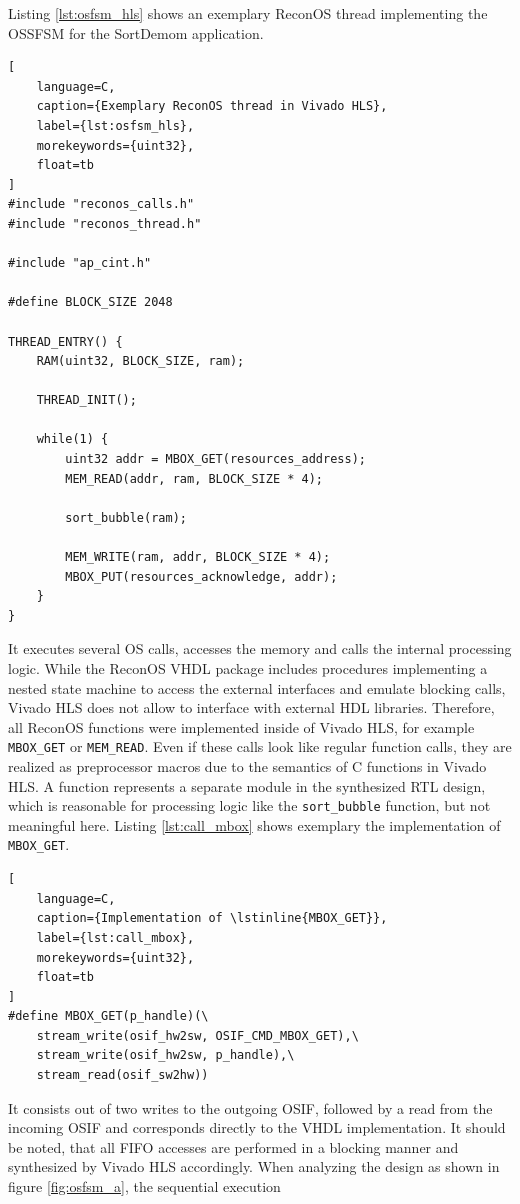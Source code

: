 Listing \ref{lst:osfsm_hls} shows an exemplary ReconOS thread implementing the
\ac{OSSFSM} for the SortDemom application.
\begin{lstlisting}[
	language=C,
	caption={Exemplary ReconOS thread in Vivado HLS},
	label={lst:osfsm_hls},
	morekeywords={uint32},
	float=tb
]
#include "reconos_calls.h"
#include "reconos_thread.h"

#include "ap_cint.h"

#define BLOCK_SIZE 2048

THREAD_ENTRY() {
	RAM(uint32, BLOCK_SIZE, ram);

	THREAD_INIT();

	while(1) {
		uint32 addr = MBOX_GET(resources_address);
		MEM_READ(addr, ram, BLOCK_SIZE * 4);

		sort_bubble(ram);

		MEM_WRITE(ram, addr, BLOCK_SIZE * 4);
		MBOX_PUT(resources_acknowledge, addr);
	}
}
\end{lstlisting}
It executes several \ac{OS} calls, accesses the memory and calls the internal
processing logic. While the ReconOS \ac{VHDL} package includes procedures
implementing a nested state machine to access the external interfaces and
emulate blocking calls, Vivado HLS does not allow to interface with external
\ac{HDL} libraries. Therefore, all ReconOS functions were implemented inside
of Vivado HLS, for example \lstinline{MBOX_GET} or \lstinline{MEM_READ}. Even
if these calls look like regular function calls, they are realized as
preprocessor macros due to the semantics of C functions in Vivado HLS. A
function represents a separate module in the synthesized \ac{RTL} design,
which is reasonable for processing logic like the \lstinline{sort_bubble}
function, but not meaningful here. Listing \ref{lst:call_mbox} shows exemplary
the implementation of \lstinline{MBOX_GET}.
\begin{lstlisting}[
	language=C,
	caption={Implementation of \lstinline{MBOX_GET}},
	label={lst:call_mbox},
	morekeywords={uint32},
	float=tb
]
#define MBOX_GET(p_handle)(\
	stream_write(osif_hw2sw, OSIF_CMD_MBOX_GET),\
	stream_write(osif_hw2sw, p_handle),\
	stream_read(osif_sw2hw))
\end{lstlisting}
It consists out of two writes to the outgoing \ac{OSIF}, followed by a read
from the incoming \ac{OSIF} and corresponds directly to the \ac{VHDL}
implementation. It should be noted, that all \ac{FIFO} accesses are performed
in a blocking manner and synthesized by Vivado HLS accordingly. When analyzing
the design as shown in figure \ref{fig:osfsm_a}, the sequential execution
